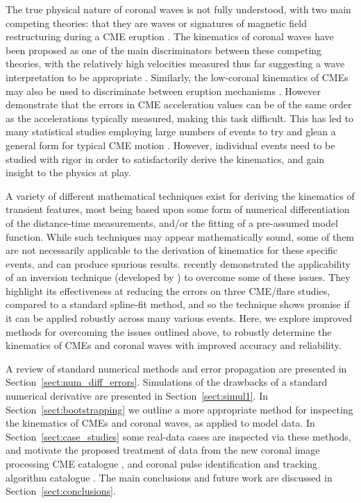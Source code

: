 \documentclass[structabstract]{aa}
\begin{document}
The true physical nature of coronal waves is not fully understood, with two main competing theories: that they are waves \citep[e.g.,][]{2012ApJ...754....7S,2010ApJ...716L..57V} or signatures of magnetic field restructuring during a CME eruption \citep[e.g.,][]{2011ApJ...738..167S,2011ApJ...732L..20C}. The kinematics of coronal waves have been proposed as one of the main discriminators between these competing theories, with the relatively high velocities measured thus far suggesting a wave interpretation to be appropriate \citep{2012ApJ...753..112Z, 2011A&A...532A.151W}. Similarly, the low-coronal kinematics of CMEs may also be used to discriminate between eruption mechanisms \citep[see, for example,][and the CME models discussed therein]{2010A&A...516A..44L}. However \citet{2007ApJ...657.1117W} demonstrate that the errors in CME acceleration values can be of the same order as the accelerations typically measured, making this task difficult. This has led to many statistical studies employing large numbers of events to try and glean a general form for typical CME motion \citep[e.g.,][]{2006ApJ...649.1100Z, 2003AdSpR..32.2637D, 2000GeoRL..27..145G}. However, individual events need to be studied with rigor in order to satisfactorily derive the kinematics, and gain insight to the physics at play.

A variety of different mathematical techniques exist for deriving the kinematics of transient features, most being based upon some form of numerical differentiation of the distance-time measurements, and/or the fitting of a pre-assumed model function. While such techniques may appear mathematically sound, some of them are not necessarily applicable to the derivation of kinematics for these specific events, and can produce spurious results. \citet{2010ApJ...712.1410T} recently demonstrated the applicability of an inversion technique (developed by \citet{2005SoPh..227..299K}) to overcome some of these issues. They highlight its effectiveness at reducing the errors on three CME/flare studies, compared to a standard spline-fit method, and so the technique shows promise if it can be applied robustly across many various events. Here, we explore improved methods for overcoming the issues outlined above, to robustly determine the kinematics of CMEs and coronal waves with improved accuracy and reliability.

A review of standard numerical methods and error propagation are presented in Section~\ref{sect:num_diff_errors}. Simulations of the drawbacks of a standard numerical derivative are presented in Section~\ref{sect:simul1}. In Section~\ref{sect:bootstrapping} we outline a more appropriate method for inspecting the  kinematics of CMEs and coronal waves, as applied to model data. In Section~\ref{sect:case_studies} some real-data cases are inspected via these methods, and motivate the proposed treatment of data from the new coronal image processing CME catalogue \citep[CORIMP;][]{2012ApJ...752..144M, 2012ApJ...752..145B}, and coronal pulse identification and tracking algorithm catalogue \citep[CorPITA;][]{2011A&A...531A..42L}. The main conclusions and future work are discussed in Section~\ref{sect:conclusions}.
\end{document}
